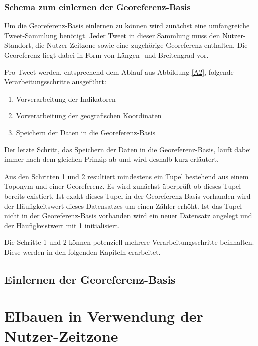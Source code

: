 			\subsubsection{Schema zum einlernen der Georeferenz-Basis}



				Um die Georeferenz-Basis einlernen zu können wird zunächst eine umfangreiche Tweet-Sammlung benötigt.
				Jeder Tweet in dieser Sammlung muss den Nutzer-Standort, die Nutzer-Zeitzone sowie eine zugehörige Georeferenz enthalten.
				Die Georeferenz liegt dabei in Form von Längen- und Breitengrad vor. 
				
				Pro Tweet werden, entsprechend dem Ablauf aus Abbildung \ref{A2}, folgende Verarbeitungsschritte ausgeführt:

				\begin{enumerate}
					\item Vorverarbeitung der Indikatoren
					\item Vorverarbeitung der geografischen Koordinaten
					\item Speichern der Daten in die Georeferenz-Basis
				\end{enumerate}

				Der letzte Schritt, das Speichern der Daten in die Georeferenz-Basis, läuft dabei immer nach dem gleichen Prinzip ab und wird deshalb kurz erläutert.
				
				Aus den Schritten 1 und 2 resultiert mindestens ein Tupel bestehend aus einem Toponym und einer Georeferenz. 
				Es wird zunächst überprüft ob dieses Tupel bereits existiert.
				Ist exakt dieses Tupel in der Georeferenz-Basis vorhanden wird der Häufigkeitswert dieses Datensatzes um einen Zähler erhöht.
				Ist das Tupel nicht in der Georeferenz-Basis vorhanden wird ein neuer Datensatz angelegt und der Häufigkeistwert mit 1 initialisiert.

				Die Schritte 1 und 2 können potenziell mehrere Verarbeitungsschritte beinhalten. 
				Diese werden in den folgenden Kapiteln erarbeitet. 





			\subsection{Einlernen der Georeferenz-Basis}




\section{EIbauen in Verwendung der Nutzer-Zeitzone} 

